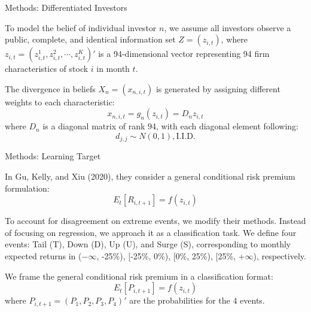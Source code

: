 \documentclass[11pt, aspectratio=169]{beamer}
\newenvironment{wideitemize}{\itemize\addtolength{\itemsep}{10pt}}{\enditemize}
\begin{document}
\begin{frame}{Methods: Differentiated Investors}
    \bigskip
    \begin{wideitemize}
    \item To model the belief of individual investor $n$, we assume all investors observe a \alert{public, complete, and identical} information set $Z = (z_{i, t})$, where $z_{i,t}=(z_{i,t}^{1},z_{i,t}^{2},\cdots,z_{i,t}^{K})'$ is a 94-dimensional vector representing 94 firm characteristics of stock $i$ in month $t$. 
    \item The divergence in beliefs $X_{n} = (x_{n,i,t})$ is generated by assigning different weights to each characteristic:
    \begin{equation*}
        x_{n,i,t} = g_n(z_{i,t}) = D_{n}z_{i,t}
    \end{equation*}
    where $D_{n}$ is a diagonal matrix of rank 94, with each diagonal element following:
    \begin{equation*}
        d_{j,j} \sim N(0,1), \text{I.I.D.}
    \end{equation*}
    \end{wideitemize}
\end{frame}

\begin{frame}{Methods: Learning Target}
    \bigskip
    \begin{wideitemize}
    \item In Gu, Kelly, and Xiu (2020), they consider a general conditional risk premium formulation:
    \begin{equation*}
        E_t[R_{i,t+1}] = f(z_{i,t})
    \end{equation*}
    \item To account for disagreement on extreme events, we modify their methods. \alert{Instead of focusing on regression, we approach it as a classification task}. We define four events: Tail (T), Down (D), Up (U), and Surge (S), corresponding to monthly expected returns in ($-\infty$, -25\%), [-25\%, 0\%), [0\%, 25\%), [25\%, $+\infty$), respectively.
    \item We frame the general conditional risk premium in a \alert{classification format}:
    \begin{equation*}
        E_t[P_{i,t+1}] = f(z_{i,t})
    \end{equation*}
    where $P_{i,t+1} =(P_{1},P_{2},P_{3},P_{4})'$ are the probabilities for the 4 events.
    \end{wideitemize}
\end{frame}
\end{document}
